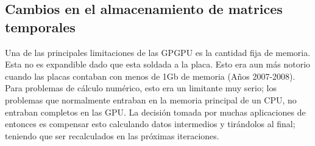 %
%
%


\subsection{Cambios en el almacenamiento de matrices temporales}
Una de las principales limitaciones de las GPGPU es la cantidad fija de memoria. Esta no es
expandible dado que esta soldada a la placa. Esto era aun m\'as notorio cuando las placas
contaban con menos de 1Gb de memoria (A\~nos 2007-2008).
Para problemas de c\'alculo num\'erico, esto era un limitante muy serio; los problemas que
normalmente entraban en la memoria principal de un CPU, no entraban completos en las GPU.
La decisi\'on tomada por muchas aplicaciones de entonces es compensar esto calculando
datos intermedios y tir\'andolos al final; teniendo que ser recalculados en las pr\'oximas iteraciones.

